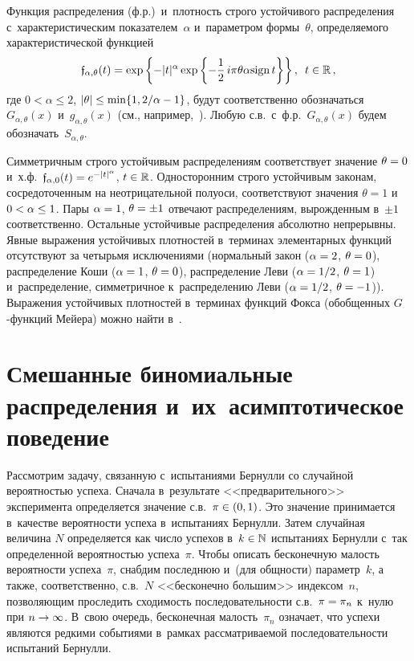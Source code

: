 \begin{multicols}{2}
Функция распределения (ф.р.)\ и~плотность строго устойчивого
распределения с~характеристическим показателем~$\alpha$ и~параметром
формы~$\theta$, определяемого характеристической функцией
$$
\mathfrak{f}_{\alpha,\theta}(t)=
\exp\left\{-|t|^{\alpha}\exp
\left\{-\displaystyle\frac{\displaystyle 1\mathstrut}{\displaystyle 2\mathstrut}\,i\pi\theta\alpha\mathrm{sign}\,t\right\}\right\},\enskip
t\in\mathbb{R}\,,
$$
где $0<\alpha\le2$, $|\theta|\hm\le\min\{1,{2}/{\alpha}-1\}$, будут
соответственно обозначаться $G_{\alpha,\theta}(x)$ 
и~$g_{\alpha,\theta}(x)$ (см., например,~\cite{Zolotarev1983-k}). Любую
с.в.\ с~ф.р.~$G_{\alpha,\theta}(x)$ будем обозначать~$S_{\alpha,\theta}$.

Симметричным строго устойчивым распределениям соответствует значение
$\theta\hm=0$ и~х.ф.~$\mathfrak{f}_{\alpha,0}(t)\hm=e^{-|t|^{\alpha}}$,
$t\hm\in\mathbb{R}$. Односторонним строго устойчивым законам, сосредоточенным
на неотрицательной полуоси, соответствуют значения $\theta=1$ и
$0\hm<\alpha\hm\le1$. Пары $\alpha\hm=1$, $\theta\hm=\pm1$ отвечают
распределениям, вырожденным в~$\pm1$ соответственно. Остальные
устойчивые распределения абсолютно непрерывны. Явные выражения
устойчивых плотностей в~терминах элементарных функций отсутствуют за
четырьмя исключениями (нормальный закон ($\alpha\hm=2$, $\theta\hm=0$),
распределение Коши ($\alpha\hm=1$, $\theta\hm=0$), распределение Леви
($\alpha\hm=1/2$, $\theta\hm=1$) и~распределение, симметричное 
к~распределению Леви ($\alpha\hm=1/2$, $\theta\hm=-1$)). Выражения
устойчивых плотностей в~терминах функций Фокса (обобщенных
$G$-функ\-ций Мейера) можно найти в~\cite{Schneider1986-k, UchaikinZolotarev1999-k}.

\section{Смешанные биномиальные распределения и~их~асимп\-то\-ти\-чес\-кое поведение}

Рассмотрим задачу, связанную с~испытаниями Бернулли со случайной
вероятностью успеха. Сначала в~результате <<предварительного>>
эксперимента определяется значение с.в.\ $\pi\hm\in(0,1)$. Это
значение принимается в~качестве вероятности успеха в~испытаниях
Бернулли. Затем случайная величина $N$ определяется как число
успехов в~$k\hm\in\mathbb{N}$ испытаниях Бернулли с~так определенной
вероятностью успеха~$\pi$. Чтобы описать бесконечную малость
вероятности успеха~$\pi$, снабдим последнюю и~(для общности)
параметр~$k$, а также, соответственно, с.в.~$N$ <<бесконечно
большим>> индексом~$n$, позволяющим проследить сходимость
последовательности с.в.\ $\pi\hm=\pi_n$ к~нулю при $n\hm\to\infty$. В~свою
очередь, бесконечная малость~$\pi_n$ означает, что успехи являются
редкими событиями в~рамках рассматриваемой последовательности
испытаний Бернулли.


\end{multicols}
